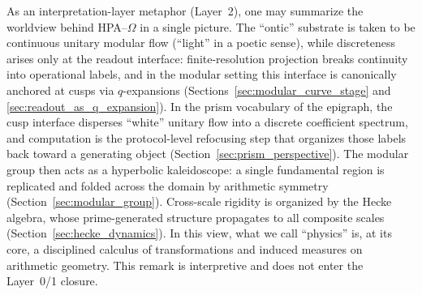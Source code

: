 \begin{remark}
As an interpretation-layer metaphor (Layer~2), one may summarize the worldview behind HPA--$\Omega$ in a single picture.
The ``ontic'' substrate is taken to be continuous unitary modular flow (``light'' in a poetic sense), while discreteness arises only at the readout interface: finite-resolution projection breaks continuity into operational labels, and in the modular setting this interface is canonically anchored at cusps via $q$-expansions (Sections~\ref{sec:modular_curve_stage} and \ref{sec:readout_as_q_expansion}).
In the prism vocabulary of the epigraph, the cusp interface disperses ``white'' unitary flow into a discrete coefficient spectrum, and computation is the protocol-level refocusing step that organizes those labels back toward a generating object (Section~\ref{sec:prism_perspective}).
The modular group then acts as a hyperbolic kaleidoscope: a single fundamental region is replicated and folded across the domain by arithmetic symmetry (Section~\ref{sec:modular_group}).
Cross-scale rigidity is organized by the Hecke algebra, whose prime-generated structure propagates to all composite scales (Section~\ref{sec:hecke_dynamics}).
In this view, what we call ``physics'' is, at its core, a disciplined calculus of transformations and induced measures on arithmetic geometry.
This remark is interpretive and does not enter the Layer~0/1 closure.
\end{remark}


